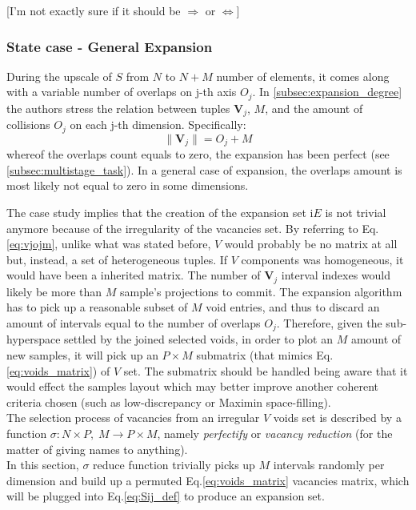 \documentclass[12pt]{extarticle}
\newcommand{\meqref}[1]{Eq.\ref{#1}}
\begin{document}
[I'm not exactly sure if it should be $\Rightarrow$ or $\Leftrightarrow$]

\subsubsection{State case - General Expansion}
\label{subsubsec:general_expansion_case}
During the upscale of $S$ from $N$ to $N+M$ number of elements, it comes along with a variable number of overlaps on j-th axis $O_j$.
In \cref{subsec:expansion_degree} the authors stress the relation between tuples $\textbf{V}_j$, $M$, and the amount of collisions $O_j$ on each j-th dimension. Specifically:
\begin{equation}
\label{eq:vjojm}	%
\parallel \textbf{V}_j \parallel = O_j + M
\end{equation}
whereof the overlaps count equals to zero, the expansion has been perfect (see \cref{subsec:multistage_task}). In a general case of expansion, the overlaps amount is most likely not equal to zero in some dimensions.

The case study implies that the creation of the expansion set i$E$ is not trivial anymore because of the irregularity of the vacancies set. By referring to \meqref{eq:vjojm}, unlike what was stated before, $V$ would probably be no matrix at all but, instead, a set of heterogeneous tuples. If $V$ components was homogeneous, it would have been a inherited matrix. The number of $\textbf{V}_j$ interval indexes would likely be more than $M$ sample's projections to commit. The expansion algorithm has to pick up a reasonable subset of $M$ void entries, and thus to discard an amount of intervals equal to the number of overlaps $O_j$. Therefore, given the sub-hyperspace settled by the joined selected voids, in order to plot an $M$ amount of new samples, it will pick up an $P \times M$ submatrix (that mimics \meqref{eq:voids_matrix}) of $V$ set. The submatrix should be handled being aware that it would effect the samples layout which may better improve another coherent criteria chosen (such as low-discrepancy or Maximin space-filling).\\
The selection process of vacancies from an irregular $V$ voids set is described by a function $\sigma: N \times P, \; M \rightarrow P \times M$, namely \textit{perfectify} or \textit{vacancy reduction} (for the matter of giving names to anything). \\ 
In this section, $\sigma$ reduce function trivially picks up $M$ intervals randomly per dimension and build up a permuted \meqref{eq:voids_matrix} vacancies matrix, which will be plugged into \meqref{eq:Sij_def} to produce an expansion set. 
\end{document}
